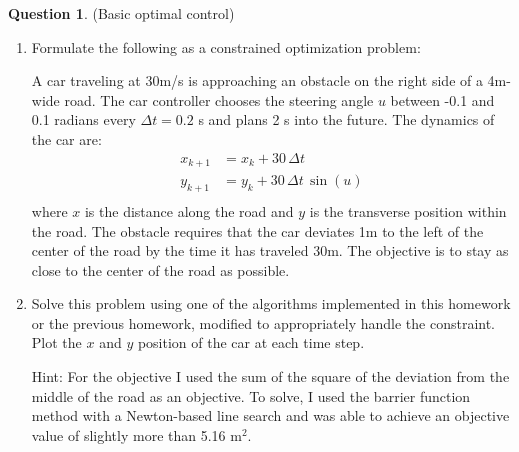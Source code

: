 \documentclass{article}
\theoremstyle{definition}
\newtheorem{question}[thm]{Question}
\begin{document}
\begin{question}(Basic optimal control)
\begin{enumerate}[label=\alph*)]
    \item Formulate the following as a constrained optimization problem:
    
    A car traveling at 30m/s is approaching an obstacle on the right side of a 4m-wide road. The car controller chooses the steering angle $u$ between -0.1 and 0.1 radians every $\Delta t = 0.2$ s and plans 2 s into the future. The dynamics of the car are:
    \begin{equation}
        \begin{aligned}
            x_{k+1} &= x_k + 30 \, \Delta t \\
            y_{k+1} &= y_k + 30 \, \Delta t \, \sin(u) \\
        \end{aligned}  
    \end{equation}
    where $x$ is the distance along the road and $y$ is the transverse position within the road.
    The obstacle requires that the car deviates 1m to the left of the center of the road by the time it has traveled 30m. The objective is to stay as close to the center of the road as possible.

    \item Solve this problem using one of the algorithms implemented in this homework or the previous homework, modified to appropriately handle the constraint. Plot the $x$ and $y$ position of the car at each time step.

    Hint: For the objective I used the sum of the square of the deviation from the middle of the road as an objective. To solve, I used the barrier function method with a Newton-based line search and was able to achieve an objective value of slightly more than 5.16 m$^2$.
    \end{enumerate}
\end{question}
\end{document}
